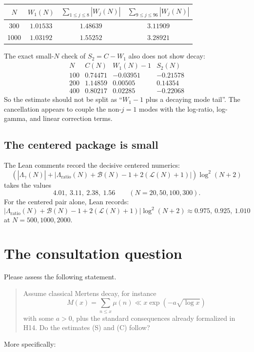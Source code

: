 \documentclass[11pt]{article}
\newcommand{\B}{\mathcal{B}}
\newcommand{\Llin}{\mathcal{L}}
\newcommand{\Lg}{\Lambda_{\gamma}}
\newcommand{\Lr}{\Lambda_{\mathrm{ratio}}}
\begin{document}
\begin{center}
\begin{tabular}{c|c|c|c}
$N$ & $W_1(N)$ & $\sum_{1\le j\le8}|W_j(N)|$
& $\sum_{9\le j\le96}|W_j(N)|$\\
\hline
300  & $1.01533$ & $1.48639$ & $3.11909$\\
1000 & $1.03192$ & $1.55252$ & $3.28921$
\end{tabular}
\end{center}

The exact small-$N$ check of $S_2=C-W_1$ also does not show decay:
\[
\begin{array}{c|c|c|c}
N & C(N) & W_1(N)-1 & S_2(N)\\
\hline
100 & 0.74471 & -0.03951 & -0.21578\\
200 & 1.14859 &  0.00505 &  0.14354\\
400 & 0.80217 &  0.02285 & -0.22068
\end{array}
\]
So the estimate should not be split as ``$W_1-1$ plus a decaying mode tail''.
The cancellation appears to couple the non-$j=1$ modes with the log-ratio,
log-gamma, and linear correction terms.

\subsection{The centered package is small}

The Lean comments record the decisive centered numerics:
\[
  \left(
    |\Lg(N)|+
    \left|\Lr(N)+\B(N)-1+2(\Llin(N)+1)\right|
  \right)\log^2(N+2)
\]
takes the values
\[
  4.01,\ 3.11,\ 2.38,\ 1.56
  \qquad (N=20,50,100,300).
\]
For the centered pair alone, Lean records:
\[
  \left|\Lr(N)+\B(N)-1+2(\Llin(N)+1)\right|\log^2(N+2)
  \approx
  0.975,\ 0.925,\ 1.010
\]
at $N=500,1000,2000$.

\section{The consultation question}

Please assess the following statement.

\begin{quote}
Assume classical Mertens decay, for instance
\[
  M(x)=\sum_{n\le x}\mu(n)
  \ll x\exp(-a\sqrt{\log x})
\]
with some $a>0$, plus the standard consequences already formalized in H14.
Do the estimates (S) and (C) follow?
\end{quote}

More specifically:
\end{document}
